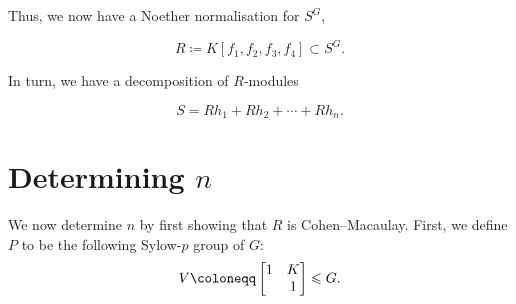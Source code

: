\documentclass[12pt]{article}
\begin{document}





	Thus, we now have a Noether normalisation for $S^{G}$,
	\begin{tcolorbox}
		\begin{equation*} 
			R \coloneqq K[f_{1}, f_{2}, f_{3}, f_{4}] \subset S^{G}.
		\end{equation*}
	\end{tcolorbox}

	In turn, we have a decomposition of $R$-modules
	\begin{tcolorbox}
		\begin{equation*} 
			S = R h_{1} + R h_{2} + \cdots + R h_{n}.
		\end{equation*}
	\end{tcolorbox}

\section{Determining \texorpdfstring{$n$}{n}}

	We now determine $n$ by first showing that $R$ is Cohen--Macaulay. 
	First, we define $P$ to be the following Sylow-$p$ group of $G$:
	\begin{equation*} 
		V \coloneqq \two{1}{K}{}{1} \le G.
	\end{equation*}
\end{document}

